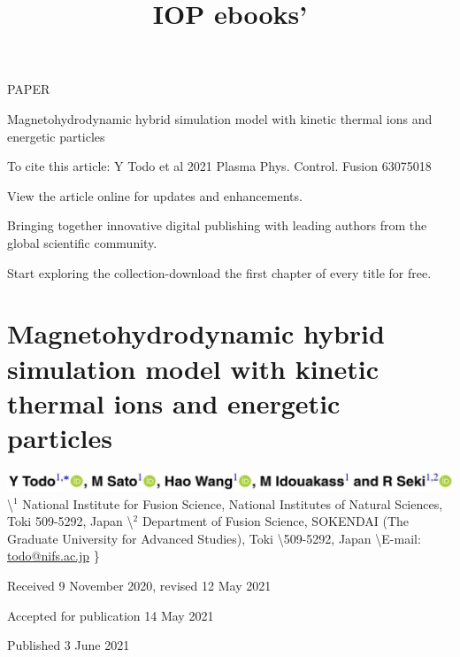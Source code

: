 \documentclass[10pt]{article}
\title{IOP ebooks' }
\author{}
\date{}
\begin{document}
\maketitle
PAPER

Magnetohydrodynamic hybrid simulation model with kinetic thermal ions and energetic particles

To cite this article: Y Todo et al 2021 Plasma Phys. Control. Fusion 63075018

View the article online for updates and enhancements.

Bringing together innovative digital publishing with leading authors from the global scientific community.

Start exploring the collection-download the first chapter of every title for free.

\section*{Magnetohydrodynamic hybrid simulation model with kinetic thermal ions and energetic particles }
\includegraphics[max width=\textwidth]{2023_06_04_de2f4b8aa3fd859f006dg-02} \textbackslash  ${ }^{1}$ National Institute for Fusion Science, National Institutes of Natural Sciences, Toki 509-5292, Japan \textbackslash  ${ }^{2}$ Department of Fusion Science, SOKENDAI (The Graduate University for Advanced Studies), Toki \textbackslash  509-5292, Japan \textbackslash  E-mail: \href{mailto:todo@nifs.ac.jp}{todo@nifs.ac.jp}
\}

Received 9 November 2020, revised 12 May 2021

Accepted for publication 14 May 2021

Published 3 June 2021
\end{document}
